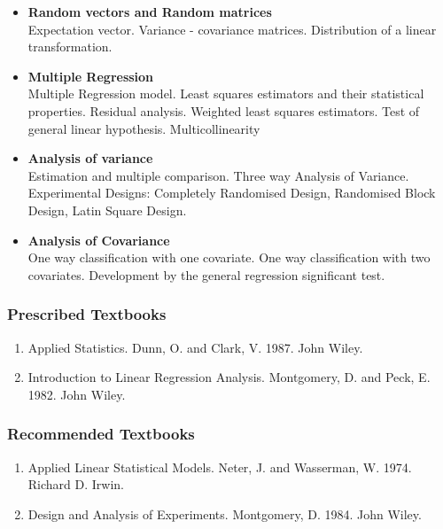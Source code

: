 \documentclass[11pt,a4paper]{article}
\theoremstyle{definition}
\begin{document}
\begin{itemize}
\item[]\textbf{Random vectors and Random matrices}\\
Expectation vector. Variance - covariance matrices. Distribution of a linear transformation.

\item[]\textbf{Multiple Regression}\\
Multiple Regression model. Least squares estimators and their statistical properties. Residual analysis. Weighted least squares estimators. Test of general  linear hypothesis. Multicollinearity

\item[]\textbf{Analysis of variance}\\
Estimation and multiple comparison. Three way Analysis of Variance. Experimental Designs: Completely Randomised Design, Randomised Block Design, Latin Square Design.

\item[]\textbf{Analysis of Covariance}\\
One way classification with one covariate. One way classification with two covariates. Development by the general regression significant test.\\
\end{itemize}


\subsubsection*{Prescribed Textbooks}
\begin{enumerate}
\item Applied Statistics. Dunn, O. and Clark, V. 1987. John Wiley.
\item Introduction to Linear Regression Analysis. Montgomery, D. and Peck, E. 1982. John Wiley.\\
\end{enumerate}


\subsubsection*{Recommended Textbooks}

\begin{enumerate}
\item Applied Linear Statistical Models. Neter, J. and Wasserman, W. 1974. Richard D. Irwin.
\item Design and Analysis of Experiments. Montgomery, D. 1984. John Wiley.
\end{enumerate}
\end{document}
